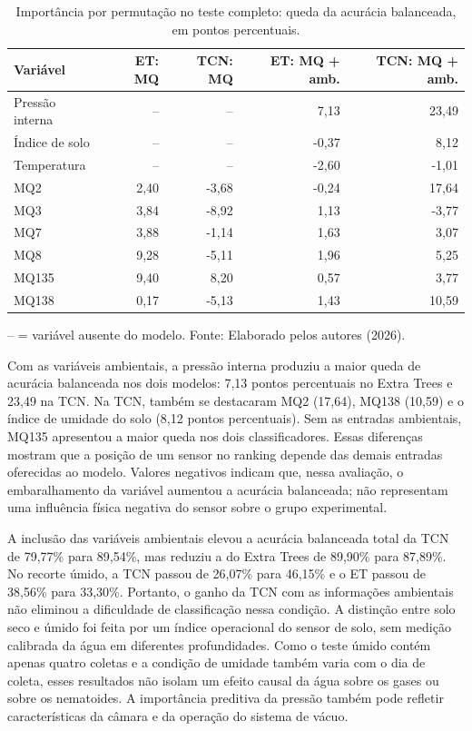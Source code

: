 \begin{table}[htbp]
    \centering
    \caption{Importância por permutação no teste completo: queda da acurácia balanceada, em pontos percentuais.}
    \label{tab:importancia_variaveis_vacuo}
    \scriptsize
    \begin{tabular}{lrrrr}
        \hline
        \textbf{Variável} &
        \textbf{ET: MQ} &
        \textbf{TCN: MQ} &
        \textbf{ET: MQ + amb.} &
        \textbf{TCN: MQ + amb.} \\
        \hline
        Pressão interna & --    & --    & 7,13  & 23,49 \\
        Índice de solo & --    & --    & -0,37 & 8,12  \\
        Temperatura     & --    & --    & -2,60 & -1,01 \\
        MQ2             & 2,40  & -3,68 & -0,24 & 17,64 \\
        MQ3             & 3,84  & -8,92 & 1,13  & -3,77 \\
        MQ7             & 3,88  & -1,14 & 1,63  & 3,07  \\
        MQ8             & 9,28  & -5,11 & 1,96  & 5,25  \\
        MQ135           & 9,40  & 8,20  & 0,57  & 3,77  \\
        MQ138           & 0,17  & -5,13 & 1,43  & 10,59 \\
        \hline
    \end{tabular}

    \vspace{0.1cm}
    {\footnotesize -- = variável ausente do modelo. Fonte: Elaborado pelos autores (2026).}
\end{table}

Com as variáveis ambientais, a pressão interna produziu a maior queda de
acurácia balanceada nos dois modelos: 7,13 pontos percentuais no Extra Trees
e 23,49 na TCN. Na TCN, também se destacaram MQ2 (17,64), MQ138 (10,59)
e o índice de umidade do solo (8,12 pontos percentuais). Sem as entradas
ambientais, MQ135 apresentou a maior queda nos dois classificadores. Essas
diferenças mostram que a posição de um sensor no ranking depende das demais
entradas oferecidas ao modelo. Valores negativos indicam que, nessa avaliação,
o embaralhamento da variável aumentou a acurácia balanceada; não representam
uma influência física negativa do sensor sobre o grupo experimental.

A inclusão das variáveis ambientais elevou a acurácia balanceada total da
TCN de 79,77\% para 89,54\%, mas reduziu a do Extra Trees de 89,90\% para
87,89\%. No recorte úmido, a TCN passou de 26,07\% para 46,15\% e o ET
passou de 38,56\% para 33,30\%. Portanto, o ganho da TCN com as
informações ambientais não eliminou a dificuldade de classificação nessa
condição. A distinção entre solo seco e úmido foi feita por um índice
operacional do sensor de solo, sem medição calibrada da água em diferentes
profundidades. Como o teste úmido contém apenas quatro coletas e a condição de
umidade também varia com o dia de coleta, esses resultados não isolam um efeito
causal da água sobre os gases ou sobre os nematoides. A importância preditiva
da pressão também pode refletir características da câmara e da operação do
sistema de vácuo.

